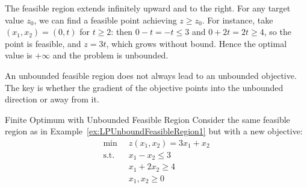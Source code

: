 \begin{solution}
The feasible region extends infinitely upward and to the right. For any target value $z_0$, we can find a feasible point achieving $z \geq z_0$. For instance, take $(x_1,x_2) = (0,t)$ for $t\geq 2$: then $0-t = -t \leq 3$ and $0+2t = 2t\geq 4$, so the point is feasible, and $z = 3t$, which grows without bound. Hence the optimal value is $+\infty$ and the problem is unbounded.
\end{solution}

An unbounded feasible region does not always lead to an unbounded objective. The key is whether the gradient of the objective points into the unbounded direction or away from it.

\begin{example}{Finite Optimum with Unbounded Feasible Region}\label{exa:LPUnboundFiniteSoln}
Consider the same feasible region as in Example~\ref{ex:LPUnboundFeasibleRegion1} but with a new objective:
\begin{equation}
\begin{aligned}
\min\;\;& z(x_1,x_2) = 3x_1 + x_2\\
\text{s.t.}\;\;& x_1 - x_2 \leq 3\\
& x_1 + 2x_2 \geq 4\\
&x_1,x_2 \geq 0
\end{aligned}
\label{eqn:LPUnboundFiniteSoln}
\end{equation}
\end{example}
